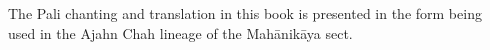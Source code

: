 \clearpage
\thispagestyle{empty}

\mbox{}
\vfill

{\centering

  
  The Pali chanting and translation in this book is presented in the form being
  used in the Ajahn Chah lineage of the Mahānikāya sect.

}

\vfill
\vspace*{5em}
\mbox{}
